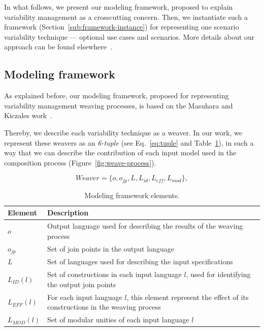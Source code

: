 \documentclass[times, 11pt,twocolumn]{article}
\begin{document}
In what follows, we present our modeling framework, proposed to explain
variability management as a crosscutting concern. Then, we instantiate such a
framework (Section~\ref{sub:framework-instance}) for representing one scenario
variability technique --- optional use cases and scenarios. More details about our approach can be found
elsewhere~\cite{Bonifacio:2008ab}.

\subsection{Modeling framework}\label{sub:framework}

As explained before, our modeling framework, proposed for representing 
variability management weaving processes, is based on the Masuhara and Kiczales
work~\cite{Masuhara:2003aa}. 

Thereby, we describe each variability technique
as a weaver. In our work, we represent these weavers as an
\emph{6-tuple} (see Eq.~\ref{eq:tuple} and Table~\ref{tab:tup-01}), in
such a way that we can describe the contribution of each input model used 
in the composition process (Figure~\ref{fig:weave-process}).

\begin{equation}
Weaver = \{o, o_{jp}, L, L_{id}, L_{eff}, L_{mod}\}, 
\label{eq:tuple}
\end{equation}

\begin{table}[bth]
\begin{center}
\caption{Modeling framework elements.} \label{tab:tup-01}
\begin{tabular}{|p{0.6in}|p{2.4in}|}
  \hline
  {\bf Element} & {\bf Description} \\ 
   \hline
  $o$          & Output language used for describing the results of the weaving process \\ \hline
  $o_{jp}$     & Set of join points in the output language \\ \hline
  $L$          & Set of languages used for describing the input specifications \\ \hline
  $L_{ID}(l)$  & Set of constructions in each input language $l$, used for identifying the output join points \\ \hline 
  $L_{EFF}(l)$ & For each input language $l$, this element represent the effect of its constructions in the weaving process \\ \hline
  $L_{MOD}(l)$ & Set of modular unities of each input language $l$\\ \hline
  \hline
\end{tabular}
\end{center}
\end{table}
\end{document}
